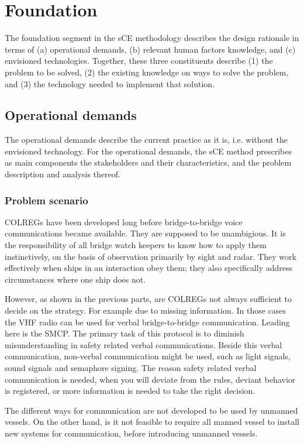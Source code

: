 \chapter{Foundation}
The foundation segment in the \ac{sCE} methodology describes the design rationale in terms of (a) operational demands, (b) relevant human factors knowledge, and (c) envisioned technologies. Together, these three constituents describe (1) the problem to be solved, (2) the existing knowledge on ways to solve the problem, and (3) the technology needed to implement that solution.

\section{Operational demands}
The operational demands describe the current practice as it is, i.e. without the envisioned technology. For the operational demands, the sCE method prescribes as main components the stakeholders and their characteristics, and the problem description and analysis thereof.

\subsection{Problem scenario}
\acf{COLREGs} have been developed long before bridge-to-bridge voice communications became available. They are supposed to be unambigious. It is the responsibility of all bridge watch keepers to know how to apply them instinctively, on the basis of observation primarily by sight and radar. They work effectively when ships in an interaction obey them; they also specifically address circumstances where one ship does not.

However, as shown in the previous parts, are \ac{COLREGs} not always sufficient to decide on the strategy. For example due to missing information. In those cases the \ac{VHF} radio can be used for verbal bridge-to-bridge communication. Leading here is the \acf{SMCP}. The primary task of this protocol is to diminish misunderstanding in safety related verbal communications. 
Beside this verbal communication, non-verbal communication might be used, such as light signals, sound signals and semaphore signing.
The reason safety related verbal communication is needed, when you will deviate from the rules, deviant behavior is registered, or more information is needed to take the right decision.

The different ways for communication are not developed to be used by unmanned vessels. On the other hand, is it not feasible to require all manned vessel to install new systems for communication, before introducing unmanned vessels.

